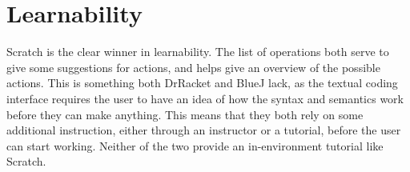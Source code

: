 \section{Learnability}
\label{sec:learnability}
Scratch is the clear winner in learnability.
The list of operations both serve to give some suggestions for actions, and helps give an overview of the possible actions.
This is something both DrRacket and BlueJ lack, as the textual coding interface requires the user to have an idea of how the syntax and semantics work before they can make anything.
This means that they both rely on some additional instruction, either through an instructor or a tutorial, before the user can start working.
Neither of the two provide an in-environment tutorial like Scratch.